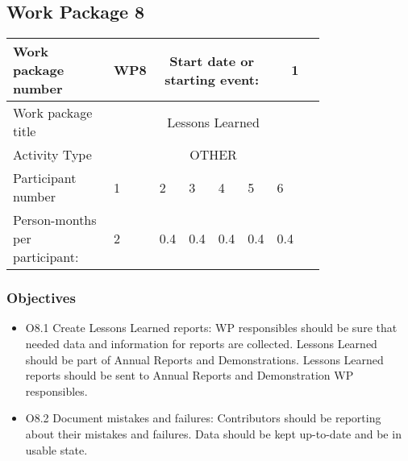 \subsection{Work Package 8}

\begin{table}[hbpt]\centering
	\begin{tabular}{|p{0.35\linewidth}|p{0.06\linewidth}|p{0.06\linewidth}|p{0.06\linewidth}|
         p{0.06\linewidth}|p{0.06\linewidth}|p{0.06\linewidth}|p{0.06\linewidth}|}\hline
		 Work package number& WP8 &
		 \multicolumn{4}{|c|}{Start date or starting event:}{}&
		 \multicolumn{2}{|c|}{                        1 }{}\\\hline
		 Work package title&\multicolumn{7}{|c|}{ Lessons Learned }{}\\\hline
		 Activity Type&\multicolumn{7}{|c|}{    OTHER}{}\\\hline
		 Participant number & 1 & 2 & 3 & 4 & 5 & 6 & ~ \\\hline
		 Person-months per participant: & 2 & 0.4 & 0.4 & 0.4 & 0.4 & 0.4 & ~ \\\hline
	\end{tabular}
\end{table}

\subsubsection{Objectives}
\begin{itemize}
	\item O8.1 Create Lessons Learned reports: WP responsibles  should be sure that needed data and information for reports are collected. Lessons Learned should be part of Annual Reports and Demonstrations. Lessons Learned reports should be sent to Annual Reports and Demonstration WP responsibles. 
	
	\item O8.2 Document mistakes and failures: Contributors should be reporting about their mistakes and failures. Data should be kept up-to-date and be in usable state.
\end{itemize}

